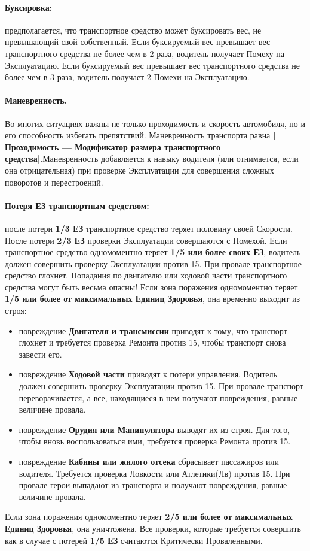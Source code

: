 \paragraph{Буксировка:} предполагается, что транспортное средство может буксировать вес, не превышающий свой собственный. Если буксируемый вес превышает вес транспортного средства не более чем в 2 раза, водитель получает Помеху на Эксплуатацию. Если буксируемый вес превышает вес транспортного средства не более чем в 3 раза, водитель получает 2 Помехи на Эксплуатацию.
\paragraph{Маневренность.} Во многих ситуациях важны не только проходимость и скорость автомобиля, но и его способность избегать препятствий. Маневренность транспорта равна \textbf{|Проходимость — Модификатор размера транспортного средства|}.Маневренность добавляется к навыку
водителя (или отнимается, если она отрицательная) при проверке Эксплуатации для совершения сложных поворотов и перестроений.
\paragraph{Потеря ЕЗ транспортным средством:} после потери \textbf{1/3 ЕЗ}
транспортное средство теряет половину своей Скорости. После
потери \textbf{2/3 ЕЗ} проверки Эксплуатации совершаются с Помехой.
\newline
Если транспортное средство одномоментно теряет \textbf{1/5 или более своих ЕЗ}, водитель должен совершить проверку Эксплуатации против 15. При провале транспортное средство глохнет.
\newline
Попадания по двигателю или ходовой части транспортного средства могут быть весьма опасны! Если зона поражения одномоментно теряет \textbf{1/5 или более от максимальных Единиц Здоровья}, она временно выходит из строя:
\begin{itemize}
\item повреждение \textbf{Двигателя и трансмиссии} приводят к тому, что транспорт глохнет и требуется проверка Ремонта против 15, чтобы транспорт снова завести его.
\item повреждение \textbf{Ходовой части} приводят к потери управления. Водитель должен совершить проверку Эксплуатации против 15. При провале транспорт переворачивается, а все, находящиеся в нем получают повреждения, равные величине провала.
\item повреждение \textbf{Орудия или Манипулятора} выводят их из строя. Для того, чтобы вновь воспользоваться ими, требуется проверка Ремонта против 15.
\item повреждение \textbf{Кабины или жилого отсека} сбрасывает пассажиров или водителя. Требуется проверка Ловкости или Атлетики(Лв) против 15. При провале герои выпадают из транспорта и получают повреждения, равные величине провала.
\end{itemize}
Если зона поражения одномоментно теряет \textbf{2/5 или более от максимальных Единиц Здоровья}, она уничтожена. Все проверки, которые требуется совершить как в случае с потерей \textbf{1/5 ЕЗ} считаются Критически Проваленными.

